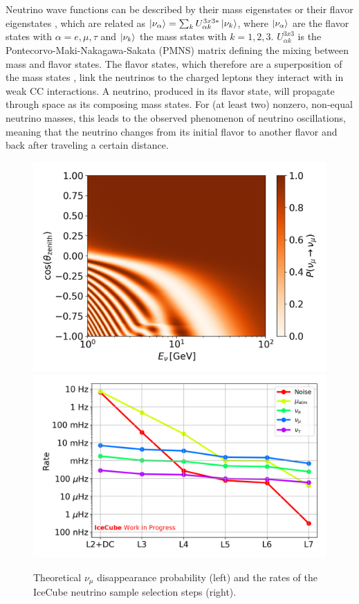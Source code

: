 \documentclass[a4paper,11pt]{article}
\begin{document}
Neutrino wave functions can be described by their mass eigenstates or their flavor eigenstates \cite{BILENKY1978225}, which are related as $\ket{\nu_\alpha} = \sum_kU^{3x3*}_{\alpha k}\ket{\nu_k}$, where $\ket{\nu_\alpha}$ are the flavor states with $\alpha=e,\mu,\tau$ and $\ket{\nu_k}$ the mass states with $k=1,2,3$. $U^{3x3}_{\alpha k}$ is the Pontecorvo-Maki-Nakagawa-Sakata (PMNS) matrix defining the mixing between mass and flavor states. The flavor states, which therefore are a superposition of the mass states \cite{PhysRevD.98.030001}, link the neutrinos to the charged leptons they interact with in weak CC interactions. A neutrino, produced in its flavor state, will propagate through space as its composing mass states. For (at least two) nonzero, non-equal neutrino masses, this leads to the observed phenomenon of neutrino oscillations, meaning that the neutrino changes from its initial flavor to another flavor and back after traveling a certain distance.

\begin{figure}[h!]
  \includegraphics[width=.44\linewidth]{figures/Oscillogram_numu_numu_orange.png}
  \includegraphics[width=.50\linewidth]{figures/OscNext_high_stats_event_selection_levels.png}
  \caption{Theoretical $\nu_{\mu}$ disappearance probability (left) and the rates of the IceCube neutrino sample selection steps (right).}
  \label{fig:oscnext_sample_and_phasespace}
\end{figure}
\end{document}
